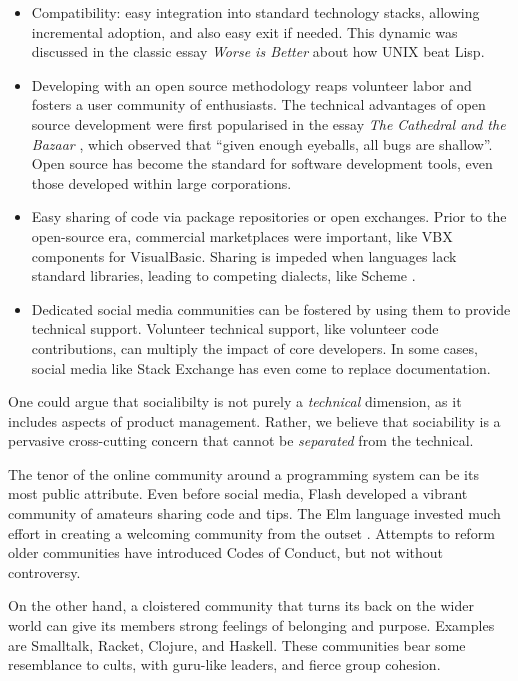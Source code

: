 \documentclass[ twoside,openright,titlepage,numbers=noenddot,headinclude,footinclude,cleardoublepage=empty,abstract=on,
                BCOR=5mm,paper=a4,fontsize=11pt
                ]{scrreprt}
\providecommand{\tightlist}{}\newenvironment{longtable}[2]{\begin{tabular}}{\end{tabular}}
\theoremstyle{definition}
\begin{document}
\begin{itemize}
\tightlist
\item
  Compatibility: easy integration into standard technology stacks,
  allowing incremental adoption, and also easy exit if needed. This
  dynamic was discussed in the classic essay \emph{Worse is Better}
  \parencite{WIB} about how UNIX beat Lisp.
\item
  Developing with an open source methodology reaps volunteer labor and
  fosters a user community of enthusiasts. The technical advantages of
  open source development were first popularised in the essay \emph{The
  Cathedral and the Bazaar} \parencite{Cathedral}, which observed that
  ``given enough eyeballs, all bugs are shallow''. Open source has
  become the standard for software development tools, even those
  developed within large corporations.
\item
  Easy sharing of code via package repositories or open exchanges. Prior
  to the open-source era, commercial marketplaces were important, like
  VBX components for VisualBasic. Sharing is impeded when languages lack
  standard libraries, leading to competing dialects, like Scheme
  \parencite{LispCurse}.
\item
  Dedicated social media communities can be fostered by using them to
  provide technical support. Volunteer technical support, like volunteer
  code contributions, can multiply the impact of core developers. In
  some cases, social media like Stack Exchange has even come to replace
  documentation.
\end{itemize}

One could argue that socialibilty is not purely a \emph{technical}
dimension, as it includes aspects of product management. Rather, we
believe that sociability is a pervasive cross-cutting concern that
cannot be \emph{separated} from the technical.

The tenor of the online community around a programming system can be its
most public attribute. Even before social media, Flash developed a
vibrant community of amateurs sharing code and tips. The Elm language
invested much effort in creating a welcoming community from the outset
\parencite{WhatIsSuccess}. Attempts to reform older communities have
introduced Codes of Conduct, but not without controversy.

On the other hand, a cloistered community that turns its back on the
wider world can give its members strong feelings of belonging and
purpose. Examples are Smalltalk, Racket, Clojure, and Haskell. These
communities bear some resemblance to cults, with guru-like leaders, and
fierce group cohesion.
\end{document}
